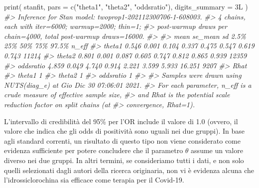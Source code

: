 \documentclass[
  10pt,
  italian,
  a4paper,
  extrafontsizes,onecolumn,openright
  ]{memoir}
\newenvironment{Shaded}{}{}
\newcommand{\AttributeTok}[1]{\textcolor[rgb]{0.49,0.56,0.16}{#1}}
\newcommand{\CommentTok}[1]{\textcolor[rgb]{0.38,0.63,0.69}{\textit{#1}}}
\newcommand{\FunctionTok}[1]{\textcolor[rgb]{0.02,0.16,0.49}{#1}}
\newcommand{\NormalTok}[1]{#1}
\newcommand{\OtherTok}[1]{\textcolor[rgb]{0.00,0.44,0.13}{#1}}
\newcommand{\SpecialCharTok}[1]{\textcolor[rgb]{0.25,0.44,0.63}{#1}}
\newcommand{\StringTok}[1]{\textcolor[rgb]{0.25,0.44,0.63}{#1}}
\begin{document}
\begin{Shaded}
\end{Shaded}

\begin{Shaded}
\begin{Highlighting}[]
\FunctionTok{print}\NormalTok{(}
\NormalTok{  stanfit,}
  \AttributeTok{pars =} \FunctionTok{c}\NormalTok{(}\StringTok{"theta1"}\NormalTok{, }\StringTok{"theta2"}\NormalTok{, }\StringTok{"oddsratio"}\NormalTok{),}
  \AttributeTok{digits\_summary =}\NormalTok{ 3L}
\NormalTok{)}
\CommentTok{\#\textgreater{} Inference for Stan model: twoprop1{-}202112300706{-}1{-}608003.}
\CommentTok{\#\textgreater{} 4 chains, each with iter=6000; warmup=2000; thin=1; }
\CommentTok{\#\textgreater{} post{-}warmup draws per chain=4000, total post{-}warmup draws=16000.}
\CommentTok{\#\textgreater{} }
\CommentTok{\#\textgreater{}            mean se\_mean    sd  2.5\%   25\%   50\%   75\%  97.5\% n\_eff}
\CommentTok{\#\textgreater{} theta1    0.546   0.001 0.104 0.337 0.475 0.547 0.619  0.743 11214}
\CommentTok{\#\textgreater{} theta2    0.801   0.001 0.087 0.605 0.747 0.812 0.865  0.939 12359}
\CommentTok{\#\textgreater{} oddsratio 4.859   0.049 4.740 0.914 2.221 3.599 5.933 16.251  9207}
\CommentTok{\#\textgreater{}           Rhat}
\CommentTok{\#\textgreater{} theta1       1}
\CommentTok{\#\textgreater{} theta2       1}
\CommentTok{\#\textgreater{} oddsratio    1}
\CommentTok{\#\textgreater{} }
\CommentTok{\#\textgreater{} Samples were drawn using NUTS(diag\_e) at Gio Dic 30 07:06:01 2021.}
\CommentTok{\#\textgreater{} For each parameter, n\_eff is a crude measure of effective sample size,}
\CommentTok{\#\textgreater{} and Rhat is the potential scale reduction factor on split chains (at }
\CommentTok{\#\textgreater{} convergence, Rhat=1).}
\end{Highlighting}
\end{Shaded}

L'intervallo di credibilità del 95\% per l'OR include il valore di 1.0 (ovvero, il valore che indica che gli odds di positività sono uguali nei due gruppi). In base agli standard correnti, un risultato di questo tipo non viene considerato come evidenza sufficiente per potere concludere che il parametro \(\theta\) assume un valore diverso nei due gruppi. In altri termini, se consideriamo tutti i dati, e non solo quelli selezionati dagli autori della ricerca originaria, non vi è evidenza alcuna che l'idrossiclorochina sia efficace come terapia per il Covid-19.
\end{document}
